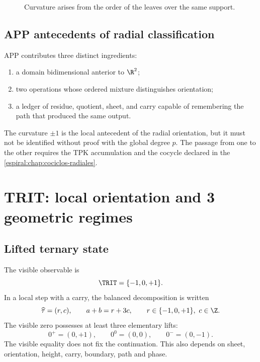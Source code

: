 \begin{figure}[htbp]
\centering
{}
\caption{Curvature arises from the order of the leaves over the same support.}
\label{espiral:fig:curvatura-app}
\end{figure}

\section{APP antecedents of radial classification}

APP contributes three distinct ingredients:
\begin{enumerate}
\item a domain bidimensional anterior to \(\R^2\);
\item two operations whose ordered mixture distinguishes orientation;
\item a ledger of residue, quotient, sheet, and carry capable of remembering the
path that produced the same output.
\end{enumerate}
The curvature \(\pm1\) is the local antecedent of the radial orientation, but
it must not be identified without proof with the global degree \(p\). The passage from one to
the other requires the TPK accumulation and the cocycle declared in the
\cref{espiral:chap:cociclos-radiales}.

\chapter{TRIT: local orientation and 3 geometric regimes}

\section{Lifted ternary state}

The visible observable is
\[
 \TRIT=\{-1,0,+1\}.
\]
In a local step with a carry, the balanced decomposition is written
\[
 \widehat\tau=(r,c),\qquad a+b=r+3c,
 \qquad r\in\{-1,0,+1\},\ c\in\Z.
\]
The visible zero possesses at least three elementary lifts:
\[
 0^+=(0,+1),\qquad0^0=(0,0),\qquad0^-=(0,-1).
\]
The visible equality does not fix the continuation. This also depends on sheet,
orientation, height, carry, boundary, path and phase.

